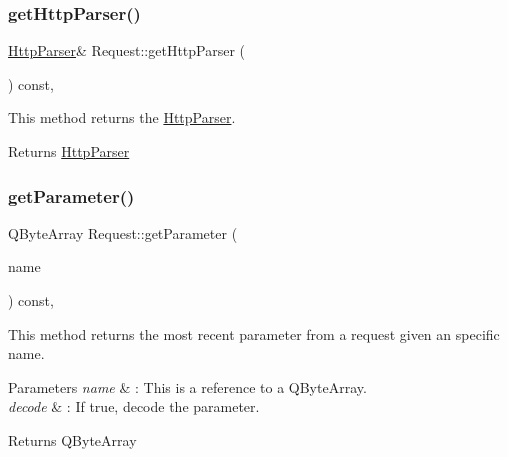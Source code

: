 \subsubsection{\texorpdfstring{get\+Http\+Parser()}{getHttpParser()}}
{\footnotesize\ttfamily \hyperlink{class_http_parser}{Http\+Parser}\& Request\+::get\+Http\+Parser (\begin{DoxyParamCaption}{ }\end{DoxyParamCaption}) const\hspace{0.3cm}{\ttfamily [inline]}, {\ttfamily [noexcept]}}



This method returns the \hyperlink{class_http_parser}{Http\+Parser}. 

\begin{DoxyReturn}{Returns}
\hyperlink{class_http_parser}{Http\+Parser} 
\end{DoxyReturn}
\mbox{\label{class_request_a0a78d7b29f1c0d96f101df866c82cef5}} 
\subsubsection{\texorpdfstring{get\+Parameter()}{getParameter()}}
{\footnotesize\ttfamily Q\+Byte\+Array Request\+::get\+Parameter (\begin{DoxyParamCaption}\item[{const Q\+Byte\+Array \&}]{name }\end{DoxyParamCaption}) const\hspace{0.3cm}{\ttfamily [inline]}, {\ttfamily [noexcept]}}



This method returns the most recent parameter from a request given an specific name. 


\begin{DoxyParams}{Parameters}
{\em name} & \+: This is a reference to a Q\+Byte\+Array. \\
\hline
{\em decode} & \+: If true, decode the parameter. \\
\hline
\end{DoxyParams}
\begin{DoxyReturn}{Returns}
Q\+Byte\+Array 
\end{DoxyReturn}
\mbox{\label{class_request_a46c49de1519d33ee2ff3cbe5a2874fc9}} 
